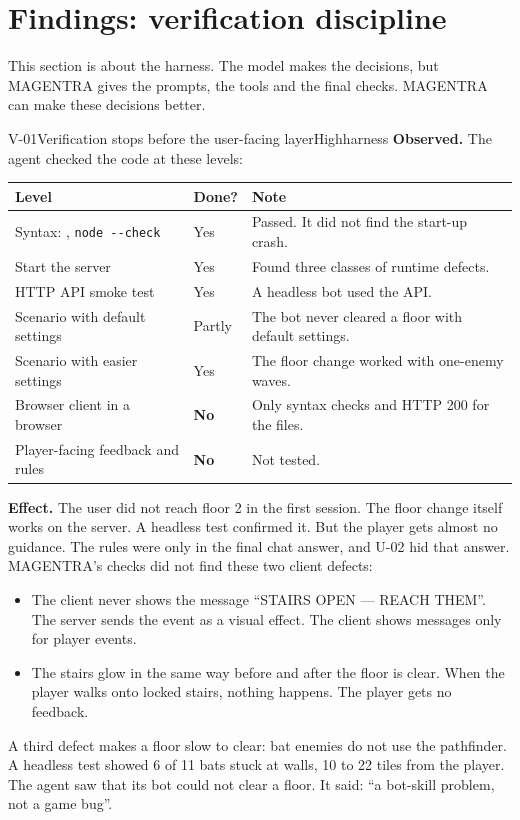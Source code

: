 \documentclass[11pt,a4paper]{article}
\newcommand{\code}[1]{\texttt{\detokenize{#1}}}
\begin{document}
\section{Findings: verification discipline}

This section is about the harness. The model makes the decisions, but MAGENTRA
gives the prompts, the tools and the final checks. MAGENTRA can make these
decisions better.

\begin{findingbox}{V-01}{Verification stops before the user-facing layer}{High}{harness}
\textbf{Observed.} The agent checked the code at these levels:

\begin{center}
\begin{tabular}{@{}p{5.2cm}p{2.2cm}p{7.2cm}@{}}
\toprule
Level & Done? & Note \\
\midrule
Syntax: \code{compileall}, \mbox{\texttt{node -{}-check}} & Yes & Passed. It did not find the start-up crash. \\
Start the server & Yes & Found three classes of runtime defects. \\
HTTP API smoke test & Yes & A headless bot used the API. \\
Scenario with default settings & Partly & The bot never cleared a floor with default settings. \\
Scenario with easier settings & Yes & The floor change worked with one-enemy waves. \\
Browser client in a browser & \textbf{No} & Only syntax checks and HTTP 200 for the files. \\
Player-facing feedback and rules & \textbf{No} & Not tested. \\
\bottomrule
\end{tabular}
\end{center}

\textbf{Effect.} The user did not reach floor 2 in the first session. The
floor change itself works on the server. A headless test confirmed it. But the
player gets almost no guidance. The rules were only in the final chat answer,
and U-02 hid that answer. MAGENTRA's checks did not find these two client
defects:
\begin{itemize}
  \item The client never shows the message ``STAIRS OPEN --- REACH THEM''. The
        server sends the event as a visual effect. The client shows messages only
        for player events.
  \item The stairs glow in the same way before and after the floor is clear.
        When the player walks onto locked stairs, nothing happens. The player gets
        no feedback.
\end{itemize}
A third defect makes a floor slow to clear: bat enemies do not use the
pathfinder. A headless test showed 6 of 11 bats stuck at walls, 10 to 22 tiles
from the player. The agent saw that its bot could not clear a floor. It said:
``a bot-skill problem, not a game bug''.


\end{findingbox}
\end{document}
